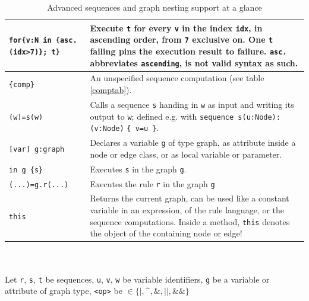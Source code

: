 \begin{table}[htbp]
\begin{minipage}{\linewidth}
\begin{tabularx}{\linewidth}{|lX|}
\texttt{for\{v:N in \{asc.(idx>7)\}; t\}}	& Execute \texttt{t} for every \texttt{v} in the index \texttt{idx}, in ascending order, from \texttt{7} exclusive on. One \texttt{t} failing pins the execution result to failure. \texttt{asc.} abbreviates \texttt{ascending}, is not valid syntax as such.\\
\hline
\texttt{\{comp\}}	& An unspecified sequence computation (see table \ref{comptab}).\\
\hline
\texttt{(w)=s(w)} & Calls a sequence \texttt{s} handing in \texttt{w} as input and writing its output to \texttt{w}; defined e.g. with \texttt{sequence s(u:Node):(v:Node)} \texttt{\{ v=u \}}.\\
\hline
\hline
\texttt{[var] g:graph}	& Declares a variable \texttt{g} of type graph, as attribute inside a node or edge class, or as local variable or parameter.\\
\hline
\texttt{in g \{s\}}	& Executes \texttt{s} in the graph \texttt{g}.\\
\hline
\texttt{(...)=g.r(...)} & Executes the rule \texttt{r} in the graph \texttt{g}\\
\hline
\texttt{this} & Returns the current graph, can be used like a constant variable in an expression, of the rule language, or the sequence computations. Inside a method, \texttt{this} denotes the object of the containing node or edge!\\
\hline
\end{tabularx}\indexmain{\texttt{<>}}\indexmain{\texttt{<<;>>}}
\end{minipage}\\
\\ 
{\small Let \texttt{r}, \texttt{s}, \texttt{t} be sequences, \texttt{u}, \texttt{v}, \texttt{w} be variable identifiers, \texttt{g} be a variable or attribute of graph type, \texttt{<op>} be $\in \{\texttt{|}, \texttt{\textasciicircum}, \texttt{\&}, \texttt{||}, \texttt{\&\&}\}$ }%
\caption{Advanced sequences and graph nesting support at a glance}
\label{seqtab}
\end{table}
 
